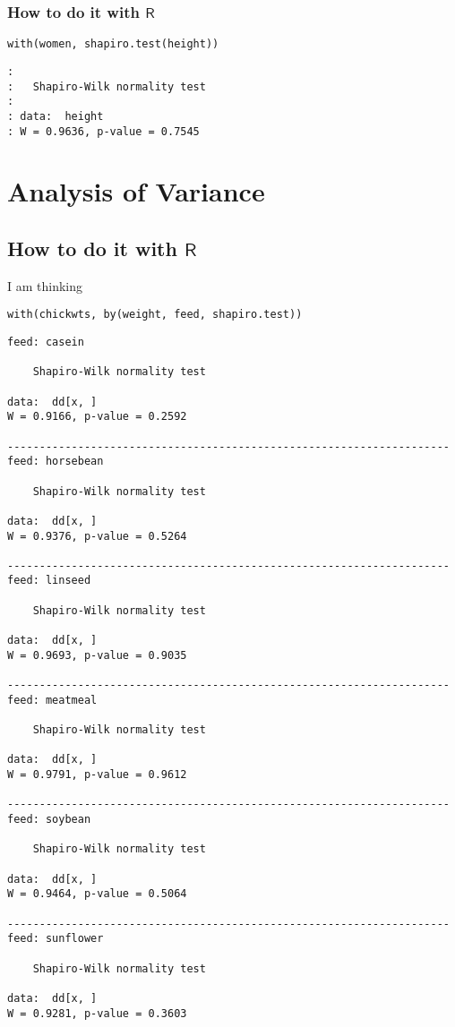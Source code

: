 \subsubsection{How to do it with \(\mathsf{R}\)}
\label{sec-10-5-2-1}

\begin{verbatim}
with(women, shapiro.test(height))
\end{verbatim}

\begin{verbatim}
: 
: 	Shapiro-Wilk normality test
: 
: data:  height
: W = 0.9636, p-value = 0.7545
\end{verbatim}

\section{Analysis of Variance}
\label{sec-10-6}

\subsection{How to do it with \(\mathsf{R}\)}
\label{sec-10-6-1}

I am thinking 
\begin{verbatim}
with(chickwts, by(weight, feed, shapiro.test))
\end{verbatim}

\begin{verbatim}
feed: casein

	Shapiro-Wilk normality test

data:  dd[x, ]
W = 0.9166, p-value = 0.2592

--------------------------------------------------------------------- 
feed: horsebean

	Shapiro-Wilk normality test

data:  dd[x, ]
W = 0.9376, p-value = 0.5264

--------------------------------------------------------------------- 
feed: linseed

	Shapiro-Wilk normality test

data:  dd[x, ]
W = 0.9693, p-value = 0.9035

--------------------------------------------------------------------- 
feed: meatmeal

	Shapiro-Wilk normality test

data:  dd[x, ]
W = 0.9791, p-value = 0.9612

--------------------------------------------------------------------- 
feed: soybean

	Shapiro-Wilk normality test

data:  dd[x, ]
W = 0.9464, p-value = 0.5064

--------------------------------------------------------------------- 
feed: sunflower

	Shapiro-Wilk normality test

data:  dd[x, ]
W = 0.9281, p-value = 0.3603
\end{verbatim}

